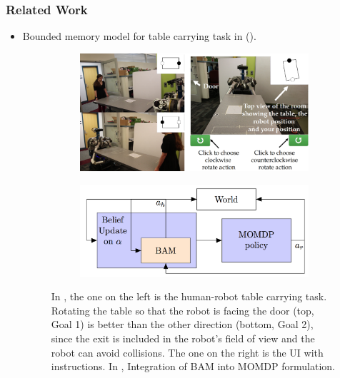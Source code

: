 \subsubsection{Related Work}
\begin{itemize}
    \item Bounded memory model for table carrying task in  (\cite{Nikolaidis_2016_8035}).
        \begin{figure}[ht]
            \centering
            \begin{subfigure}[b]{.5\linewidth}
            \includegraphics[width=\linewidth]{./bam1.png}
            \caption{}
            \label{fig:bam1}
            \end{subfigure}
            \begin{subfigure}[b]{.4\linewidth}
            \includegraphics[width=\linewidth]{./bam2.png}
            \caption{}
            \label{fig:bam2}
            \end{subfigure}
            \caption{In , the one on the left is the human-robot table carrying task. Rotating the table so that the robot is facing the door (top, Goal 1) is better than the other direction (bottom, Goal 2), since the exit is included in the robot’s field of view and the robot can avoid collisions. The one on the right is the UI with instructions. In , Integration of BAM into MOMDP formulation.}

\end{figure}
\end{itemize}
